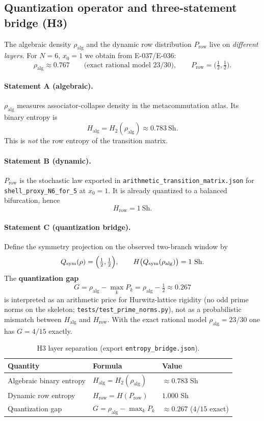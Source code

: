 \documentclass[11pt, lettersize, article]{article}
\theoremstyle{definition}
\theoremstyle{remark}
\begin{document}
\subsection{Quantization operator and three-statement bridge (H3)}

The algebraic density $\rho_{\mathrm{alg}}$ and the dynamic row distribution $P_{\mathrm{row}}$ live on
\emph{different layers}.
For $N=6$, $x_0=1$ we obtain from E-037/E-036:
\[
  \rho_{\mathrm{alg}}\approx 0.767
  \qquad\text{(exact rational model $23/30$)},\qquad
  P_{\mathrm{row}}=\bigl(\tfrac12,\tfrac12\bigr).
\]

\paragraph{Statement A (algebraic).}
$\rho_{\mathrm{alg}}$ measures associator-collapse density in the metacommutation atlas.
Its binary entropy is
\[
  H_{\mathrm{alg}}=H_2(\rho_{\mathrm{alg}})\approx 0.783\ \mathrm{Sh}.
\]
This is \emph{not} the row entropy of the transition matrix.

\paragraph{Statement B (dynamic).}
$P_{\mathrm{row}}$ is the stochastic law exported in
\texttt{arithmetic\_transition\_matrix.json} for \texttt{shell\_proxy\_N6\_for\_5} at $x_0=1$.
It is already quantized to a balanced bifurcation, hence
\[
  H_{\mathrm{row}}=1\ \mathrm{Sh}.
\]

\paragraph{Statement C (quantization bridge).}
Define the symmetry projection on the observed two-branch window by
\[
  Q_{\mathrm{sym}}(\rho)=\Bigl(\tfrac12,\tfrac12\Bigr),
  \qquad
  H\bigl(Q_{\mathrm{sym}}(\rho_{\mathrm{alg}})\bigr)=1\ \mathrm{Sh}.
\]
The \textbf{quantization gap}
\[
  G=\rho_{\mathrm{alg}}-\max_k P_k
  =\rho_{\mathrm{alg}}-\tfrac12
  \approx 0.267
\]
is interpreted as an arithmetic price for Hurwitz-lattice rigidity
(no odd prime norms on the skeleton; \texttt{tests/test\_prime\_norms.py}),
not as a probabilistic mismatch between $H_{\mathrm{alg}}$ and $H_{\mathrm{row}}$.
With the exact rational model $\rho_{\mathrm{alg}}=23/30$ one has $G=4/15$ exactly.

\begin{table}[htbp]
\centering
\caption{H3 layer separation (export \texttt{entropy\_bridge.json}).}
\label{tab:h3-layers}
\begin{tabular}{l l l}
\toprule
Quantity & Formula & Value \\
\midrule
Algebraic binary entropy & $H_{\mathrm{alg}}=H_2(\rho_{\mathrm{alg}})$ & $\approx 0.783$ Sh \\
Dynamic row entropy & $H_{\mathrm{row}}=H(P_{\mathrm{row}})$ & $1.000$ Sh \\
Quantization gap & $G=\rho_{\mathrm{alg}}-\max_k P_k$ & $\approx 0.267$ ($4/15$ exact) \\
\bottomrule
\end{tabular}
\end{table}
\end{document}
